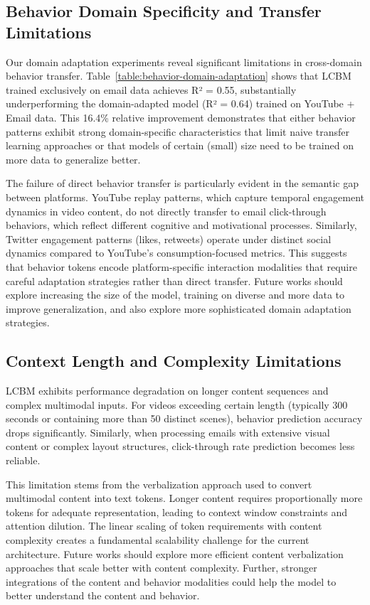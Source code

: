 \subsection{Behavior Domain Specificity and Transfer Limitations}

Our domain adaptation experiments reveal significant limitations in cross-domain behavior transfer. Table~\ref{table:behavior-domain-adaptation} shows that LCBM trained exclusively on email data achieves R² = 0.55, substantially underperforming the domain-adapted model (R² = 0.64) trained on YouTube + Email data. This 16.4\% relative improvement demonstrates that either behavior patterns exhibit strong domain-specific characteristics that limit naive transfer learning approaches or that models of certain (small) size need to be trained on more data to generalize better.

The failure of direct behavior transfer is particularly evident in the semantic gap between platforms. YouTube replay patterns, which capture temporal engagement dynamics in video content, do not directly transfer to email click-through behaviors, which reflect different cognitive and motivational processes. Similarly, Twitter engagement patterns (likes, retweets) operate under distinct social dynamics compared to YouTube's consumption-focused metrics. This suggests that behavior tokens encode platform-specific interaction modalities that require careful adaptation strategies rather than direct transfer. Future works should explore increasing the size of the model, training on diverse and more data to improve generalization, and also explore more sophisticated domain adaptation strategies.


\subsection{Context Length and Complexity Limitations}

LCBM exhibits performance degradation on longer content sequences and complex multimodal inputs. For videos exceeding certain length (typically 300 seconds or containing more than 50 distinct scenes), behavior prediction accuracy drops significantly. Similarly, when processing emails with extensive visual content or complex layout structures, click-through rate prediction becomes less reliable.

This limitation stems from the verbalization approach used to convert multimodal content into text tokens. Longer content requires proportionally more tokens for adequate representation, leading to context window constraints and attention dilution. The linear scaling of token requirements with content complexity creates a fundamental scalability challenge for the current architecture. Future works should explore more efficient content verbalization approaches that scale better with content complexity. Further, stronger integrations of the content and behavior modalities could help the model to better understand the content and behavior.


